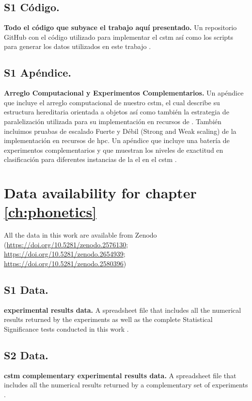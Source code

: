 {\subsection{S1 Código.}
\label{S1_Code}
{\bf Todo el código que subyace el trabajo aquí presentado.} Un repositorio GitHub con el código utilizado para implementar el \gls{cstm} así como los scripts para generar los datos utilizados en este trabajo \cite{dematties_dario_2019_2580396}.

\subsection{S1 Apéndice.}
\label{S1_Appendix}
{\bf Arreglo Computacional y Experimentos Complementarios.} Un apéndice que incluye el arreglo computacional de nuestro \gls{cstm}, el cual describe su estructura hereditaria orientada a objetos así como también la estrategia de paralelización utilizada para su implementación en recursos de . También incluimos pruabas de escalado Fuerte y Débil (Strong and Weak scaling) de la implementación en recursos de \gls{hpc}. Un apéndice que incluye una batería de experimentos complementarios y que muestran los niveles de exactitud en clasificación para diferentes instancias de la \gls{el} en el \gls{cstm} \cite{dematties_dario_2019_2654939}.
}{
\section{Data availability for chapter \ref{ch:phonetics}}

All the data in this work are available from Zenodo (\url{https://doi.org/10.5281/zenodo.2576130}; \url{https://doi.org/10.5281/zenodo.2654939}; \url{https://doi.org/10.5281/zenodo.2580396})

\subsection{S1 Data.}
\label{S1_Data}
{\bf {} experimental results data.} A spreadsheet file that includes all the numerical results returned by the experiments as well as the complete Statistical Significance tests conducted in this work \cite{dematties_dario_2019_2654939}.

\subsection{S2 Data.}
\label{S2_Data}
{\bf \gls{cstm} complementary experimental results data.} A spreadsheet file that includes all the numerical results returned by a complementary set of experiments \cite{dematties_dario_2019_2654939}.

}
